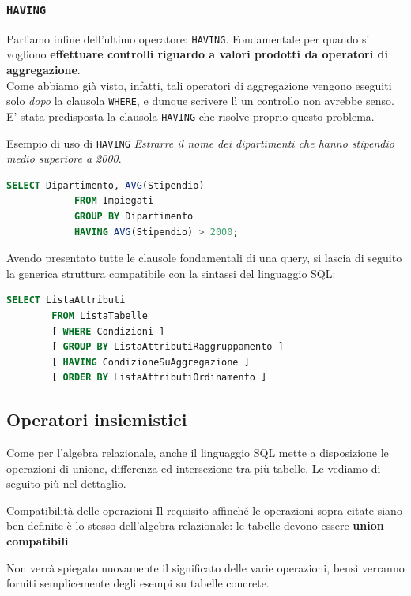 \documentclass[12pt]{report}
\begin{document}
	\subsubsection*{\texttt{HAVING}}
	Parliamo infine dell'ultimo operatore: \texttt{HAVING}. Fondamentale per quando si vogliono \textbf{effettuare controlli riguardo a valori prodotti da operatori di aggregazione}.\\
	Come abbiamo già visto, infatti, tali operatori di aggregazione vengono eseguiti solo \textit{dopo} la clausola \texttt{WHERE}, e dunque scrivere lì un controllo non avrebbe senso. E' stata predisposta la clausola \texttt{HAVING} che risolve proprio questo problema.
	\begin{esempio}{Esempio di uso di \texttt{HAVING}}{}
		\textit{Estrarre il nome dei dipartimenti che hanno stipendio medio superiore a 2000}.
		\begin{lstlisting}[language=SQL]
			SELECT Dipartimento, AVG(Stipendio)
			FROM Impiegati
			GROUP BY Dipartimento
			HAVING AVG(Stipendio) > 2000;
		\end{lstlisting}
	\end{esempio}
	
	Avendo presentato tutte le clausole fondamentali di una query, si lascia di seguito la generica struttura compatibile con la sintassi del linguaggio SQL:
	\begin{lstlisting}[language=SQL]
		SELECT ListaAttributi
		FROM ListaTabelle
		[ WHERE Condizioni ]
		[ GROUP BY ListaAttributiRaggruppamento ]
		[ HAVING CondizioneSuAggregazione ]
		[ ORDER BY ListaAttributiOrdinamento ]
	\end{lstlisting}
	
	\newpage
	\subsection{Operatori insiemistici}
	Come per l'algebra relazionale, anche il linguaggio SQL mette a disposizione le operazioni di unione, differenza ed intersezione tra più tabelle. Le vediamo di seguito più nel dettaglio.
	
	\begin{osservazione}{Compatibilità delle operazioni}{}
		Il requisito affinché le operazioni sopra citate siano ben definite è lo stesso dell'algebra relazionale: le tabelle devono essere \textbf{union compatibili}.
	\end{osservazione}
	
	Non verrà spiegato nuovamente il significato delle varie operazioni, bensì verranno forniti semplicemente degli esempi su tabelle concrete.
	
\end{document}
